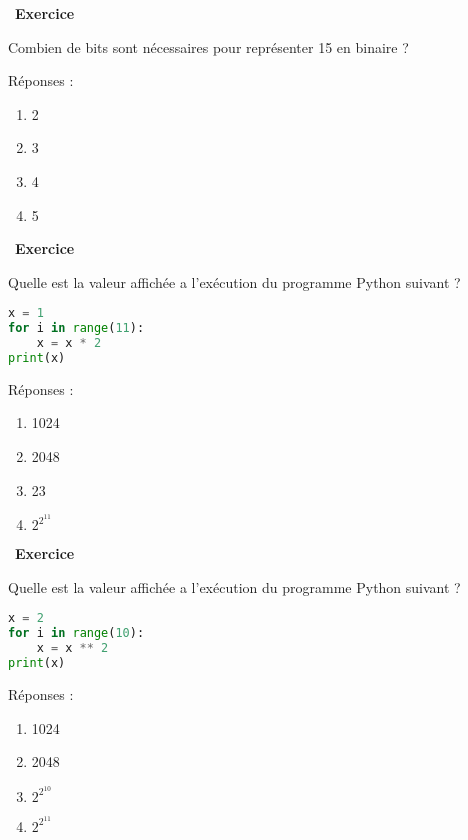 \documentclass[
  11pt,
]{article}
\providecommand{\tightlist}{%
  \setlength{\itemsep}{0pt}\setlength{\parskip}{0pt}}
\newcounter{exo}
\newenvironment{exercice}[1]
{\par \medskip   \addtocounter{exo}{1} \noindent  
\begin{bclogo}[arrondi =0.1,   noborder = true, logo=\bccrayon, marge=4]{~\textbf{Exercice} \textbf{\theexo} {\itshape #1} }  \par}
{
\end{bclogo}
 \par \bigskip }
\newcounter{def}
\newcounter{prog}
\begin{document}
\begin{exercice}{}

Combien de bits sont nécessaires pour représenter 15 en binaire ?

Réponses :

\begin{enumerate}
\def\labelenumi{\arabic{enumi}.}
\tightlist
\item
  2
\item
  3
\item
  4
\item
  5
\end{enumerate}

\end{exercice}

\begin{exercice}{}

Quelle est la valeur affichée a l'exécution du programme Python suivant
?

\begin{lstlisting}[language=Python]
x = 1 
for i in range(11): 
    x = x * 2 
print(x)
\end{lstlisting}

Réponses :

\begin{enumerate}
\def\labelenumi{\arabic{enumi}.}
\tightlist
\item
  1024
\item
  2048
\item
  23
\item
  \(2^{2^{11}}\)
\end{enumerate}

\end{exercice}

\begin{exercice}{}

Quelle est la valeur affichée a l'exécution du programme Python suivant
?

\begin{lstlisting}[language=Python]
x = 2 
for i in range(10): 
    x = x ** 2 
print(x)
\end{lstlisting}

Réponses :

\begin{enumerate}
\def\labelenumi{\arabic{enumi}.}
\tightlist
\item
  1024
\item
  2048
\item
  \(2^{2^{10}}\)
\item
  \(2^{2^{11}}\)
\end{enumerate}

\end{exercice}
\end{document}
